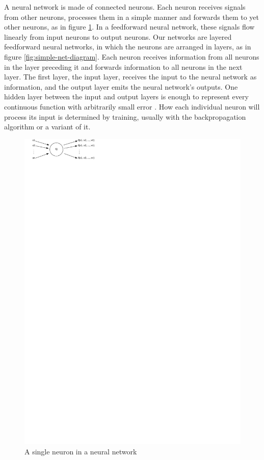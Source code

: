 \documentclass{article}
\begin{document}
A neural network is made of connected neurons. Each neuron receives
signals from other neurons, processes them in a simple manner and
forwards them to yet other neurons, as in figure \ref{fig:neuron}. In
a feedforward neural network, these signals flow linearly from input
neurons to output neurons. Our networks are layered feedforward neural
networks, in which the neurons are arranged in layers, as in figure
\ref{fig:simple-net-diagram}. Each neuron receives information from
all neurons in the layer preceding it and forwards information to all
neurons in the next layer. The first layer, the input layer, receives
the input to the neural network as information, and the output layer
emits the neural network's outputs. One hidden layer between the input
and output layers is enough to represent every continuous function
with arbitrarily small error \cite{russell.ea:artificial}. How each
individual neuron will process its input is determined by training,
usually with the backpropagation algorithm or a variant of it.


\begin{figure}
  \includegraphics[scale=1]{neuron}
  \caption{A single neuron in a neural network}
  \label{fig:neuron}
\end{figure}
\end{document}
